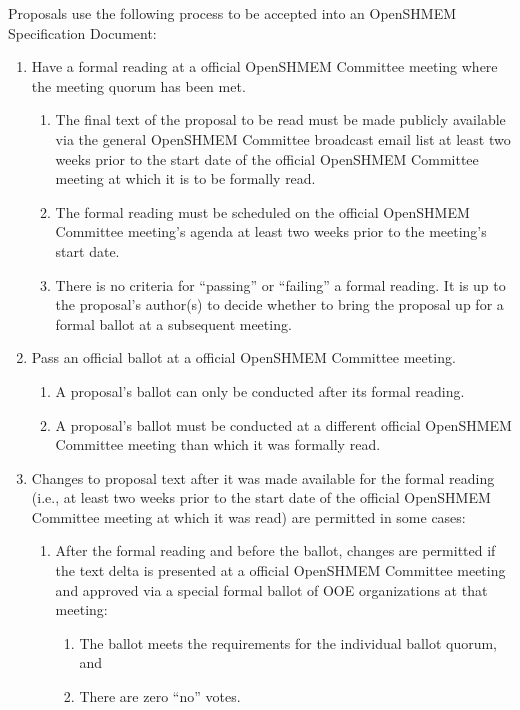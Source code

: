 Proposals use the following process to be accepted into
an OpenSHMEM Specification Document:

\begin{enumerate}
\item Have a formal reading at a official OpenSHMEM Committee meeting where the
  meeting quorum has been met.
  \begin{enumerate}
  \item The final text of the proposal to be read must be made
    publicly available via the general OpenSHMEM Committee broadcast email list
    at least two weeks prior to the start date of the official OpenSHMEM
    Committee meeting at which it is to be formally read.
  \item The formal reading must be scheduled on the official OpenSHMEM Committee
    meeting's agenda at least two weeks prior to the meeting's start
    date.
  \item There is no criteria for ``passing'' or ``failing'' a formal
    reading.  It is up to the proposal's author(s) to decide whether
    to bring the proposal up for a formal ballot at a subsequent
    meeting.
  \end{enumerate}

\item Pass an official ballot at a official OpenSHMEM Committee meeting.
  \begin{enumerate}
  \item A proposal's ballot can only be conducted after its
    formal reading.
  \item A proposal's ballot must be conducted at a different
    official OpenSHMEM Committee meeting than which it was formally read.
  \end{enumerate}

\item Changes to proposal text after it was made available for the
  formal reading (i.e., at least two weeks prior to the start date of
  the official OpenSHMEM Committee meeting at which it was read) are permitted
  in some cases:
  \begin{enumerate}
  \item After the formal reading and before the ballot, changes are permitted if the text
    delta is presented at a official OpenSHMEM Committee meeting and approved
    via a special formal ballot of OOE organizations at that
    meeting:
    \begin{enumerate}
    \item The ballot meets the requirements for the individual
      ballot quorum, and
    \item There are zero ``no'' votes.
    \end{enumerate}


\end{enumerate}
\end{enumerate}
